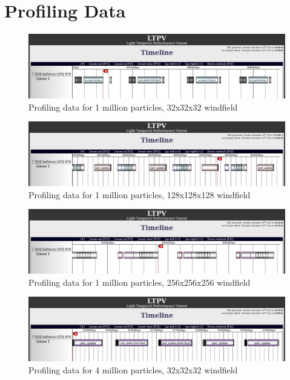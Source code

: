 
\chapter{Profiling Data}
\label{appendix-b}

\begin{figure}[ht!]
\centering
\includegraphics[width=\textwidth]{fig/profiling/1m_32}
\caption{Profiling data for 1 million particles, 32x32x32 windfield}
\label{fig:1m_32}
\end{figure}

\begin{figure}[ht!]
\centering
\includegraphics[width=\textwidth]{fig/profiling/1m_128}
\caption{Profiling data for 1 million particles, 128x128x128 windfield}
\label{fig:1m_128}
\end{figure}

\begin{figure}[ht!]
\centering
\includegraphics[width=\textwidth]{fig/profiling/1m_256}
\caption{Profiling data for 1 million particles, 256x256x256 windfield}
\label{fig:1m_256}
\end{figure}

\begin{figure}[ht!]
\centering
\includegraphics[width=\textwidth]{fig/profiling/4m_32}
\caption{Profiling data for 4 million particles, 32x32x32 windfield}
\label{fig:4m_32}
\end{figure}

